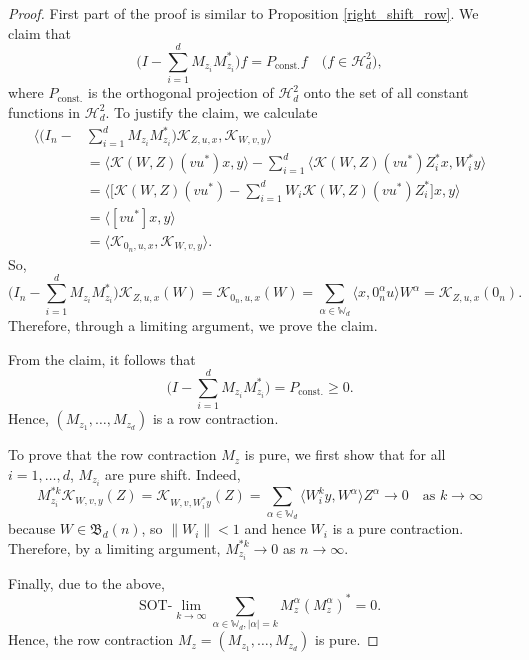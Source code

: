 \documentclass[12pt]{amsart}%
\numberwithin{equation}{section}
\newcommand{\bW}{\mathbb{W}}
\newcommand{\fB}{{\mathfrak{B}}}
\newcommand{\clh}{\mathcal{H}}
\newcommand{\clk}{\mathcal{K}}
\newcommand\la{{\langle }}
\newcommand\ra{{\rangle}}
\begin{document}
\begin{proof}
First part of the proof is similar to Proposition \ref{right_shift_row}. We claim that 
\[
\Big(I-\sum_{i=1}^dM_{z_i}M_{z_i}^*\Big)f=P_{\text{const.}}f\quad\big(f\in\clh^2_d\big),
\]
where $P_{\text{const.}}$ is the orthogonal projection of $\clh^2_d$ onto the set of all constant functions in $\clh^2_d$. To justify the claim, we calculate
\begin{align*}
\Big\langle \Big(I_n-&\sum_{i=1}^dM_{z_i}M_{z_i}^*\Big)\clk_{Z,u,x},\clk_{W,v,y}\Big\rangle\\
&=\la\clk(W,Z)(vu^*)x,y\ra-\sum_{i=1}^d\la\clk(W,Z)(vu^*)Z_i^*x,W_i^*y\ra\\
&=\Big\langle\Big[\clk(W,Z)(vu^*)-\sum_{i=1}^d W_i\clk(W,Z)(vu^*)Z_i^*\Big]x,y\Big\rangle\\
&=\la[vu^*]x,y\ra\\
&=\la\clk_{0_n,u,x},\clk_{W,v,y}\ra.
\end{align*}
So,
\[
\Big(I_n-\sum_{i=1}^d M_{z_i}M_{z_i}^*\Big)\clk_{Z,u,x}(W)=\clk_{0_n,u,x}(W)=\sum_{\alpha\in\bW_d}\langle x,0_n^{\alpha} u\rangle W^{\alpha}=\clk_{Z,u,x}(0_n).
\]
Therefore, through a limiting argument, we prove the claim. 

From the claim, it follows that
\[
\Big(I-\sum_{i=1}^dM_{z_i}M_{z_i}^*\Big)=P_{\text{const.}}\geq 0.
\]
Hence, $(M_{z_1},\ldots,M_{z_d})$ is a row contraction. 

To prove that the row contraction $M_z$ is pure, we first show that for all $i=1,\ldots,d$, $M_{z_i}$ are pure shift. Indeed,
\[
M_{z_i}^{*k}\clk_{W,v,y}(Z)=\clk_{W,v,W_i^*y}(Z)=\sum_{\alpha\in\bW_d}\la W_i^ky,W^{\alpha}\ra Z^{\alpha}\to 0\quad\text{as}\,\,k\to\infty
\]
because $W\in\fB_d(n)$, so $\|W_i\|<1$ and hence $W_i$ is a pure contraction. Therefore, by a limiting argument, $M_{z_i}^{*k}\to 0$ as $n\to\infty$. 

Finally, due to the above,
\[
\text{SOT-}\lim_{k\to\infty}\sum_{\alpha\in\bW_d,|\alpha|=k}M_z^{\alpha}(M_z^{\alpha})^*=0.
\]
Hence, the row contraction $M_z=(M_{z_1},\ldots,M_{z_d})$ is pure. 
\end{proof}
 
\end{document}
